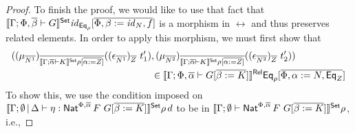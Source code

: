 \documentclass[acmsmall,review,anonymous]{acmart}
\theoremstyle{definition}
\renewcommand{\id}{\mathit{id}}
\begin{document}
\begin{proof}
To finish the proof, we would like to use that fact that 
$\setsem{\Gamma; \Phi,\ol\beta \vdash G}\id_{\Eq_\rho} [\ol{\Phi, \beta := \id_N, f}]$
is a morphism in $\rel$ and thus preserves related elements. 
In order to apply this morphism, we must first show that 
\begin{align*}
((\mu_{\overline{N^1}})_{\overline{\llbracket{\Gamma; \overline{\alpha} \vdash K}\rrbracket^{\mathsf{Set}} \rho[\overline{\alpha := Z}]}} 
  ((\epsilon_{\overline{N^1}})_{\overline{Z}} \,\, t_1') &, 
  (\mu_{\overline{N^2}})_{\overline{\llbracket{\Gamma; \overline{\alpha} \vdash K}\rrbracket^{\mathsf{Set}} \rho[\overline{\alpha := Z}]}} 
  ((\epsilon_{\overline{N^2}})_{\overline{Z}} \,\, t_2')) \\
  & \in 
  \llbracket{\Gamma; \Phi, \overline{\alpha} \vdash
        G[\overline{\beta := K}]}\rrbracket^{\mathsf{Rel}}\mathsf{Eq}_{\rho}[\overline{\Phi, \alpha := N, \mathsf{Eq}_Z}]
\end{align*}
To show this, we use the condition imposed on 
$\llbracket{\Gamma; \emptyset \,|\, \Delta \vdash \eta : \mathsf{Nat}^{\Phi, \overline{\alpha}} \, F \,\, G[\overline{\beta := K}]}\rrbracket^{\mathsf{Set}} \rho \, d$ to be 
in $\llbracket{\Gamma; \emptyset \vdash \mathsf{Nat}^{\Phi, \overline{\alpha}} \, F \,\, G[\overline{\beta := K}]}\rrbracket^{\mathsf{Set}} \rho$, i.e.,


\end{proof}
\end{document}
